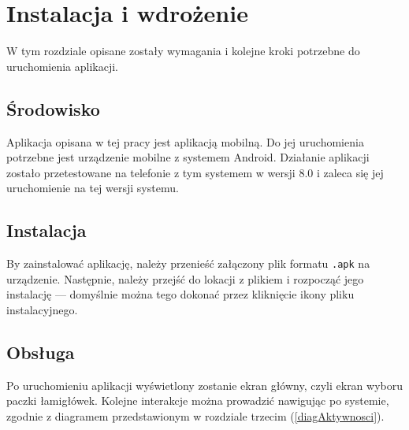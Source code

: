 \chapter{Instalacja i wdrożenie}
\thispagestyle{chapterBeginStyle}

    W tym rozdziale opisane zostały wymagania i kolejne kroki potrzebne do uruchomienia aplikacji.



\section{Środowisko}
    Aplikacja opisana w tej pracy jest aplikacją mobilną. Do jej uruchomienia potrzebne jest
urządzenie mobilne z systemem Android. Działanie aplikacji zostało przetestowane na telefonie
z tym systemem w wersji 8.0 i zaleca się jej uruchomienie na tej wersji systemu.


\section{Instalacja}
    By zainstalować aplikację, należy przenieść załączony plik formatu \texttt{.apk} na urządzenie.
Następnie, należy przejść do lokacji z plikiem i rozpocząć jego instalację — domyślnie można
tego dokonać przez kliknięcie ikony pliku instalacyjnego.


\section{Obsługa}
    Po uruchomieniu aplikacji wyświetlony zostanie ekran główny, czyli ekran wyboru paczki łamigłówek.
Kolejne interakcje można prowadzić nawigując po systemie, zgodnie z diagramem przedstawionym w
rozdziale trzecim (\ref{diagAktywnosci}).
